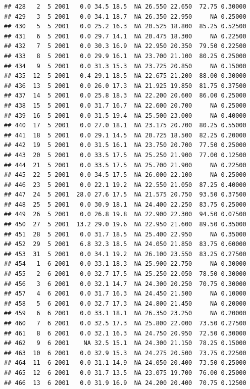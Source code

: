\documentclass[
]{book}
\begin{document}
\begin{verbatim}
## 428   2  5 2001   0.0 34.5 18.5  NA 26.550 22.650  72.75 0.30000
## 429   3  5 2001   0.0 34.1 18.7  NA 26.350 22.950     NA 0.25000
## 430   5  5 2001   0.0 25.2 16.3  NA 20.525 18.800  85.25 0.52500
## 431   6  5 2001   0.0 29.7 14.1  NA 20.475 18.300     NA 0.22500
## 432   7  5 2001   0.0 30.3 16.9  NA 22.950 20.350  79.50 0.22500
## 433   8  5 2001   0.0 29.9 16.1  NA 23.700 21.100  80.25 0.25000
## 434   9  5 2001   0.0 31.3 15.3  NA 23.725 20.850     NA 0.15000
## 435  12  5 2001   0.4 29.1 18.5  NA 22.675 21.200  88.00 0.30000
## 436  13  5 2001   0.0 26.0 17.3  NA 21.925 19.850  81.75 0.37500
## 437  14  5 2001   0.0 25.8 18.3  NA 22.200 20.600  86.00 0.25000
## 438  15  5 2001   0.0 31.7 16.7  NA 22.600 20.700     NA 0.25000
## 439  16  5 2001   0.0 31.5 19.4  NA 25.500 23.000     NA 0.40000
## 440  17  5 2001   0.0 27.0 18.1  NA 23.175 20.700  80.25 0.55000
## 441  18  5 2001   0.0 29.1 14.5  NA 20.725 18.500  82.25 0.20000
## 442  19  5 2001   0.0 31.5 16.1  NA 23.750 20.700  77.50 0.25000
## 443  20  5 2001   0.0 33.5 17.5  NA 25.250 21.900  77.00 0.12500
## 444  21  5 2001   0.0 33.5 17.5  NA 25.700 21.900     NA 0.22500
## 445  22  5 2001   0.0 34.5 17.5  NA 26.000 22.100     NA 0.25000
## 446  23  5 2001   0.0 22.1 19.2  NA 22.550 21.050  87.25 0.40000
## 447  24  5 2001  28.0 27.6 17.5  NA 21.575 20.750  93.50 0.37500
## 448  25  5 2001   0.0 30.9 18.1  NA 24.400 22.250  83.75 0.25000
## 449  26  5 2001   0.0 26.8 19.8  NA 22.900 22.300  94.50 0.07500
## 450  27  5 2001  13.2 29.0 19.6  NA 22.950 21.600  89.50 0.35000
## 451  28  5 2001   0.0 31.7 18.5  NA 25.400 22.950     NA 0.35000
## 452  29  5 2001   6.8 32.3 18.5  NA 24.050 21.850  83.75 0.60000
## 453  31  5 2001   0.0 34.1 19.2  NA 26.100 23.550  83.25 0.27500
## 454   1  6 2001   0.0 33.1 18.3  NA 25.900 22.750     NA 0.30000
## 455   2  6 2001   0.0 32.7 17.5  NA 25.250 22.050  78.50 0.30000
## 456   3  6 2001   0.0 32.1 14.7  NA 24.300 20.250  70.75 0.30000
## 457   4  6 2001   0.0 31.7 16.3  NA 24.450 21.500     NA 0.10000
## 458   5  6 2001   0.0 32.7 17.3  NA 24.800 21.450     NA 0.20000
## 459   6  6 2001   0.0 33.1 18.1  NA 26.350 23.250     NA 0.20000
## 460   7  6 2001   0.0 32.5 17.3  NA 25.800 22.000  73.50 0.27500
## 461   8  6 2001   0.0 32.1 16.3  NA 24.750 20.950  72.50 0.30000
## 462   9  6 2001    NA 32.5 15.1  NA 24.300 21.150  78.25 0.15000
## 463  10  6 2001   0.0 32.9 15.3  NA 24.275 20.500  73.75 0.22500
## 464  11  6 2001   0.0 31.1 14.9  NA 24.050 20.400  73.50 0.25000
## 465  12  6 2001   0.0 31.7 13.5  NA 23.075 19.700  76.00 0.25000
## 466  13  6 2001   0.0 31.9 16.9  NA 24.200 20.400  70.75 0.12500

\end{verbatim}
\end{document}

